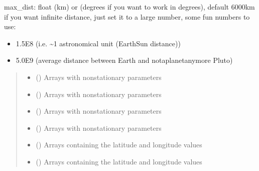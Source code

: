 \documentclass[letterpaper,10pt,english]{sphinxmanual}
\begin{document}
\begin{fulllineitems}
\sphinxAtStartPar
max\_dist:
float (km) or (degrees if you want to work in degrees), default 6000km
if you want infinite distance, just set it to a large number, some fun
numbers to use:
\begin{itemize}
\item {}
\sphinxAtStartPar
1.5E8 (i.e. \textasciitilde{}1 astronomical unit (Earth\sphinxhyphen{}Sun distance))

\item {}
\sphinxAtStartPar
5.0E9 (average distance between Earth and not\sphinxhyphen{}a\sphinxhyphen{}planet\sphinxhyphen{}anymore Pluto)

\end{itemize}
\begin{quote}\begin{description}
\begin{itemize}
\item {}
\sphinxAtStartPar
{} () \textendash{} Arrays with non\sphinxhyphen{}stationary parameters

\item {}
\sphinxAtStartPar
{} () \textendash{} Arrays with non\sphinxhyphen{}stationary parameters

\item {}
\sphinxAtStartPar
{} () \textendash{} Arrays with non\sphinxhyphen{}stationary parameters

\item {}
\sphinxAtStartPar
{} () \textendash{} Arrays with non\sphinxhyphen{}stationary parameters

\item {}
\sphinxAtStartPar
{} () \textendash{} Arrays containing the latitude and longitude values

\item {}
\sphinxAtStartPar
{} () \textendash{} Arrays containing the latitude and longitude values


\end{itemize}
\end{description}
\end{quote}
\end{fulllineitems}
\end{document}
